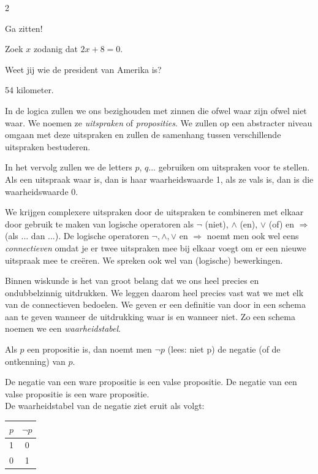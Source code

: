 \begin{multicols}{2}
\begin{opsomming}                                     
\item Ga zitten!
\item Zoek $x$ zodanig dat $2x+8=0$.
\item Weet jij wie de president van Amerika is?
\item 54 kilometer.
\end{opsomming}

In de logica zullen we ons bezighouden met zinnen die ofwel waar zijn ofwel niet waar. We noemen ze \emph{uitspraken} of \emph{proposities}. We zullen op een abstracter niveau omgaan met deze uitspraken en zullen de samenhang tussen verschillende uitspraken bestuderen. 

In het vervolg zullen we de letters $p$, $q$... gebruiken om uitspraken voor te stellen. Als een uitspraak waar is, dan is haar waarheidswaarde 1, als ze vals is, dan is die waarheidswaarde 0. 
 
We krijgen complexere uitspraken door de uitspraken te combineren met elkaar door gebruik te maken van logische operatoren als $\lnot$ (niet), $\land$ (en), $\lor$ (of) en $\Rightarrow$ (als ... dan ...). De logische operatoren $\lnot, \land, \lor$ en $\Rightarrow$ noemt men ook wel eens \emph{connectieven} omdat je er twee uitspraken mee bij elkaar voegt om er een nieuwe uitspraak mee te creëren. We spreken ook wel van (logische) bewerkingen.

Binnen wiskunde is het van groot belang dat we ons heel precies en ondubbelzinnig uitdrukken. We leggen daarom heel precies vast wat we met elk van de connectieven bedoelen. We geven er een definitie van door in een schema aan te geven wanneer de uitdrukking waar is en wanneer niet. Zo een schema noemen we een \emph{waarheidstabel}.


Als $p$ een propositie is, dan noemt men $\lnot p$ (lees: niet p) de negatie (of de ontkenning) van $p$. 

De negatie van een ware propositie is een valse propositie. De negatie van een valse propositie is een ware propositie.\\

De waarheidstabel van de negatie ziet eruit als volgt:

\begin{center}
\begin{tabular}{c|c}  
$p$ & $\lnot p$\\
\hline
1 & 0\\
0 & 1
\end{tabular}
\end{center}


\end{multicols}
